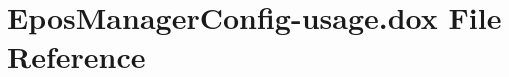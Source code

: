 \section{\-Epos\-Manager\-Config-\/usage.dox \-File \-Reference}
\label{EposManagerConfig-usage_8dox}
